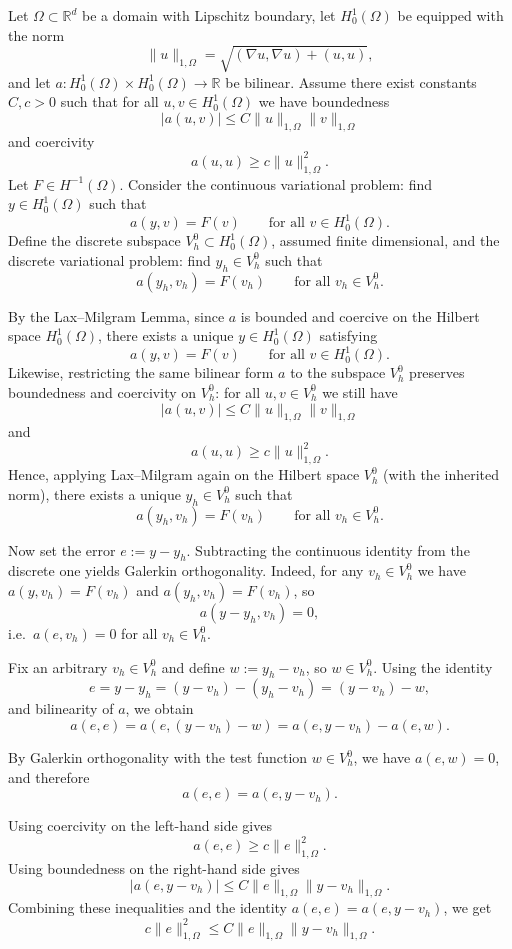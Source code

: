 \documentclass{article}
\begin{document}
Let $\Omega \subset \mathbb{R}^d$ be a domain with Lipschitz boundary, let $H^1_0(\Omega)$ be equipped with the norm
\[
\|u\|_{1,\Omega} = \sqrt{(\nabla u,\nabla u) + (u,u)},
\]
and let $a: H^1_0(\Omega)\times H^1_0(\Omega)\to \mathbb{R}$ be bilinear. Assume there exist constants $C,c>0$ such that for all $u,v\in H^1_0(\Omega)$ we have boundedness
\[
|a(u,v)| \le C\|u\|_{1,\Omega}\|v\|_{1,\Omega}
\]
and coercivity
\[
a(u,u) \ge c\|u\|_{1,\Omega}^2.
\]
Let $F\in H^{-1}(\Omega)$. Consider the continuous variational problem: find $y\in H^1_0(\Omega)$ such that
\[
a(y,v)=F(v) \qquad \text{for all } v\in H^1_0(\Omega).
\]
Define the discrete subspace $V_h^0 \subset H^1_0(\Omega)$, assumed finite dimensional, and the discrete variational problem: find $y_h\in V_h^0$ such that
\[
a(y_h,v_h)=F(v_h) \qquad \text{for all } v_h\in V_h^0.
\]

By the Lax--Milgram Lemma, since $a$ is bounded and coercive on the Hilbert space $H^1_0(\Omega)$, there exists a unique $y\in H^1_0(\Omega)$ satisfying
\[
a(y,v)=F(v) \qquad \text{for all } v\in H^1_0(\Omega).
\]
Likewise, restricting the same bilinear form $a$ to the subspace $V_h^0$ preserves boundedness and coercivity on $V_h^0$: for all $u,v\in V_h^0$ we still have
\[
|a(u,v)| \le C\|u\|_{1,\Omega}\|v\|_{1,\Omega}
\]
and
\[
a(u,u) \ge c\|u\|_{1,\Omega}^2.
\]
Hence, applying Lax--Milgram again on the Hilbert space $V_h^0$ (with the inherited norm), there exists a unique $y_h\in V_h^0$ such that
\[
a(y_h,v_h)=F(v_h) \qquad \text{for all } v_h\in V_h^0.
\]

Now set the error $e := y - y_h$. Subtracting the continuous identity from the discrete one yields Galerkin orthogonality. Indeed, for any $v_h\in V_h^0$ we have $a(y,v_h)=F(v_h)$ and $a(y_h,v_h)=F(v_h)$, so
\[
a(y-y_h,v_h)=0,
\]
i.e.\ $a(e,v_h)=0$ for all $v_h\in V_h^0$.

Fix an arbitrary $v_h\in V_h^0$ and define $w := y_h - v_h$, so $w\in V_h^0$. Using the identity
\[
e = y - y_h = (y - v_h) - (y_h - v_h) = (y - v_h) - w,
\]
and bilinearity of $a$, we obtain
\[
a(e,e) = a(e,(y-v_h)-w) = a(e,y-v_h) - a(e,w).
\]

By Galerkin orthogonality with the test function $w\in V_h^0$, we have $a(e,w)=0$, and therefore
\[
a(e,e) = a(e,y-v_h).
\]

Using coercivity on the left-hand side gives
\[
a(e,e) \ge c\|e\|_{1,\Omega}^2.
\]
Using boundedness on the right-hand side gives
\[
|a(e,y-v_h)| \le C\|e\|_{1,\Omega}\|y-v_h\|_{1,\Omega}.
\]
Combining these inequalities and the identity $a(e,e)=a(e,y-v_h)$, we get
\[
c\|e\|_{1,\Omega}^2 \le C\|e\|_{1,\Omega}\|y-v_h\|_{1,\Omega}.
\]
\end{document}
